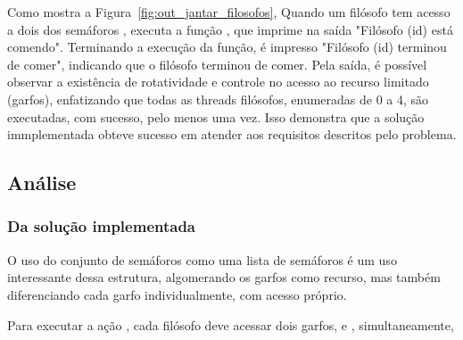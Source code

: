 \documentclass[
	12pt,				%
	openright,			%
	oneside,			%
	a4paper,			%
	chapter=TITLE,		%
	english,			%
	french,				%
	spanish,			%
	brazil				%
	]{abntex2}
\theoremstyle{definition}
\begin{document}
Como mostra a Figura~\ref{fig:out_jantar_filosofos}, Quando um filósofo tem acesso a dois dos semáforos , executa a função , que imprime na saída "Filósofo (id) está comendo". Terminando a execução da função, é impresso "Filósofo (id) terminou de comer", indicando que o filósofo terminou de comer. Pela saída, é possível observar a existência de rotatividade e controle no acesso ao recurso limitado (garfos), enfatizando que todas as threads filósofos, enumeradas de 0 a 4, são executadas, com sucesso, pelo menos uma vez. Isso demonstra que a solução immplementada obteve sucesso em atender aos requisitos descritos pelo problema.

\subsection{Análise}
\subsubsection{Da solução implementada}
O uso do conjunto de semáforos  como uma lista de semáforos é um uso interessante dessa estrutura, algomerando os garfos como recurso, mas também diferenciando cada garfo individualmente, com acesso próprio. 

Para executar a ação , cada filósofo deve acessar dois garfos,  e , simultaneamente, 

\clearpage
\end{document}
